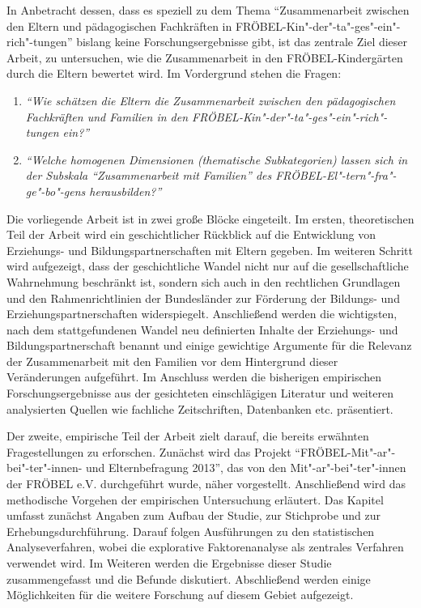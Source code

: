 \documentclass[12pt,a4paper]{article}
\begin{document}
In Anbetracht dessen, dass es speziell zu dem Thema "`Zusammenarbeit zwischen den Eltern und pädagogischen Fachkräften in FRÖBEL-Kin"-der"-ta"-ges"-ein"-rich"-tungen"' bislang keine Forschungsergebnisse gibt, ist das zentrale Ziel dieser Arbeit, zu untersuchen, wie die Zusammenarbeit in den FRÖBEL-Kindergärten durch die Eltern bewertet wird. Im Vordergrund stehen die Fragen:
\pagebreak
\begin{enumerate}
\item \textit{"`Wie schätzen die Eltern die Zusammenarbeit zwischen den pädagogischen Fachkräften und Familien in den FRÖBEL-Kin"-der"-ta"-ges"-ein"-rich"-tungen ein?"'}
\item \textit{"`Welche homogenen Dimensionen (thematische Subkategorien) lassen sich in der Subskala "`Zusammenarbeit mit Familien"' des FRÖBEL-El"-tern"-fra"-ge"-bo"-gens herausbilden?"'}
\end{enumerate}

Die vorliegende Arbeit ist in zwei große Blöcke eingeteilt. Im ersten, theoretischen Teil der Arbeit wird ein geschichtlicher Rückblick auf die Entwicklung von Erziehungs- und Bildungspartnerschaften mit Eltern gegeben. Im weiteren Schritt  wird aufgezeigt, dass der geschichtliche Wandel nicht nur auf die gesellschaftliche Wahrnehmung beschränkt ist, sondern sich auch in den rechtlichen Grundlagen und den Rahmenrichtlinien der Bundesländer zur Förderung der Bildungs- und Erziehungspartnerschaften widerspiegelt. Anschließend werden die wichtigsten, nach dem stattgefundenen Wandel neu definierten Inhalte der Erziehungs- und Bildungspartnerschaft benannt und einige gewichtige Argumente für die Relevanz der Zusammenarbeit mit den Familien vor dem Hintergrund dieser Veränderungen aufgeführt. Im Anschluss werden die bisherigen empirischen Forschungsergebnisse aus der gesichteten einschlägigen Literatur und weiteren analysierten Quellen wie fachliche Zeitschriften, Datenbanken etc. präsentiert.

Der zweite, empirische Teil der Arbeit zielt darauf, die bereits erwähnten Fragestellungen zu erforschen. Zunächst wird das Projekt "`FRÖBEL-Mit"-ar"-bei"-ter"-innen- und Elternbefragung 2013"', das von den Mit"-ar"-bei"-ter"-innen der FRÖBEL e.V. durchgeführt wurde, näher vorgestellt. Anschließend wird das methodische Vorgehen der empirischen Untersuchung erläutert. Das Kapitel umfasst zunächst Angaben zum Aufbau der Studie, zur Stichprobe und zur Erhebungsdurchführung. Darauf folgen Ausführungen zu den statistischen Analyseverfahren, wobei die explorative Faktorenanalyse als zentrales Verfahren verwendet wird. Im Weiteren werden die Ergebnisse dieser Studie zusammengefasst und die Befunde diskutiert. Abschließend werden einige Möglichkeiten für die weitere Forschung auf diesem Gebiet aufgezeigt.	
	
\end{document}
